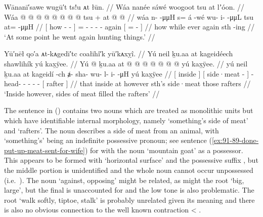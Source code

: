 \ex\label{ex:91-8-went-again-hunting}%
%
\begingl
	\glpreamble	Wānanī′sawe wugū′t ts!u ᴀt łūn. //
	\glpreamble	Wáa nanée sáwé woogoot tsu at lʼóon. //
	\gla	{} Wáa  @ {} @ {} @ {} {}
		 @ {} @ {}
		 @ {} @ {} @ {} tsu +
		{} at @  @ {} {} {} //
	\glb	{} wáa n-  -μμH {} {} 
		s= á -wé
		wu- i-  -μμL tsu
		{} at=  -μμH {} {} //
	\glc	{}[ how -  - \· {}]
		=  -
		- -  - again
		{}[ =  - \hspace{1.5em}\· {}] //
	\gld	{} how  {} {} \·while {}
		ever\·  {}
		 {} {} {} again
		{} sth\•  {} \hspace{1.5em}-ing {} //
	\glft	‘At some point he went again hunting things.’
		//
\endgl
\xe


\ex\label{ex:91-9-went-again-hunting}%
%
\begingl
	\glpreamble	Yū′nēł qo′a ᴀt-kᴀgedī′tc coałihî′k yū′kᴀxỵî. //
	\glpreamble	Yú neil ḵu.aa at kageidéech shawlihík yú kax̱ÿee. //
	\gla	{} Yú  @ {} {} ḵu.aa
		{} at  @ {} {}
		 @ {} @ {} @ {} @ {} @ {} @ {}
		{} yú kax̱ÿee. {} //
	\glb	{} yú neil {} {} ḵu.aa
		{} at kageidí -ch {}
		ⱥ- sha- wu- l- i-  -μH
		{} yú kax̱ÿee {} //
	\glc	{}[  inside \· {}] 
		{}[  side·meat - {}]
		- head- - - -  -
		{}[  rafter {}] //
	\gld	{} that inside \·at {} however
		{} sth’s side·meat {} {}
		 {} {} {} {} {} {}
		{} those rafters {} //
	\glft	‘Inside however, sides of meat filled the rafters’
		//
\endgl
\xe

The sentence in (\lastx) contains two nouns which are treated as monolithic units but which have identifiable internal morphology, namely  ‘something’s side of meat’ and  ‘rafters’.
The noun  describes a side of meat from an animal, with  ‘something’s’ being an indefinite possessive pronoun; see sentence (\ref{ex:91-89-done-put-up-meat-sent-for-wife}) for  with the noun  ‘mountain goat’ as a possessor.
This appears to be formed with  ‘horizontal surface’ and the possessive suffix , but the middle portion  is unidentified and the whole noun cannot occur unpossessed (i.e.\ ).
The noun  ‘against, opposing’ might be related, as might the root  ‘big, large’, but the final  is unaccounted for and the low tone is also problematic.
The root  ‘walk softly, tiptoe, stalk’ is probably unrelated given its meaning and there is also no obvious connection to the well known contraction  < .

